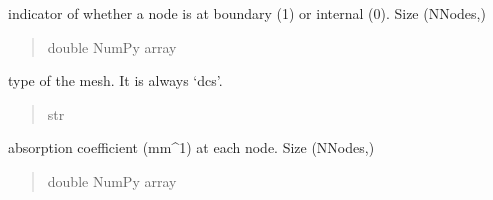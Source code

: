 \documentclass[letterpaper,10pt,english]{sphinxmanual}
\begin{document}
\begin{fulllineitems}
\begin{fulllineitems}
\label{\detokenize{_autosummary/nirfasterff.base.dcs_mesh.dcsmesh:nirfasterff.base.dcs_mesh.dcsmesh.bndvtx}}
\pysigstartsignatures
\pysigline
{}
\pysigstopsignatures
\sphinxAtStartPar
indicator of whether a node is at boundary (1) or internal (0). Size (NNodes,)
\begin{quote}\begin{description}
\sphinxAtStartPar
double NumPy array

\end{description}\end{quote}

\end{fulllineitems}


\begin{fulllineitems}
\label{\detokenize{_autosummary/nirfasterff.base.dcs_mesh.dcsmesh:nirfasterff.base.dcs_mesh.dcsmesh.type}}
\pysigstartsignatures
\pysigline
{}
\pysigstopsignatures
\sphinxAtStartPar
type of the mesh. It is always ‘dcs’.
\begin{quote}\begin{description}
\sphinxAtStartPar
str

\end{description}\end{quote}

\end{fulllineitems}


\begin{fulllineitems}
\label{\detokenize{_autosummary/nirfasterff.base.dcs_mesh.dcsmesh:nirfasterff.base.dcs_mesh.dcsmesh.mua}}
\pysigstartsignatures
\pysigline
{}
\pysigstopsignatures
\sphinxAtStartPar
absorption coefficient (mm\textasciicircum{}\sphinxhyphen{}1) at each node. Size (NNodes,)
\begin{quote}\begin{description}
\sphinxAtStartPar
double NumPy array

\end{description}\end{quote}


\end{fulllineitems}
\end{fulllineitems}
\end{document}
